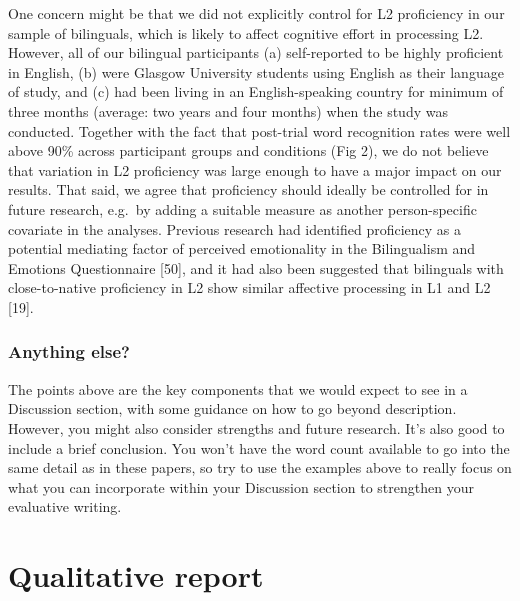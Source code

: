 \documentclass[
  english,
  letterpaper,
  DIV=11,
  numbers=noendperiod]{scrreprt}
\begin{document}
\begin{tcolorbox}[enhanced jigsaw, breakable, bottomtitle=1mm, leftrule=.75mm, opacityback=0, colbacktitle=quarto-callout-note-color!10!white, opacitybacktitle=0.6, toprule=.15mm, colback=white, left=2mm, coltitle=black, bottomrule=.15mm, titlerule=0mm, title={Study 3: Toivo et al., 2019}, toptitle=1mm, colframe=quarto-callout-note-color-frame, arc=.35mm, rightrule=.15mm]

One concern might be that we did not explicitly control for L2
proficiency in our sample of bilinguals, which is likely to affect
cognitive effort in processing L2. However, all of our bilingual
participants (a) self-reported to be highly proficient in English, (b)
were Glasgow University students using English as their language of
study, and (c) had been living in an English-speaking country for
minimum of three months (average: two years and four months) when the
study was conducted. Together with the fact that post-trial word
recognition rates were well above 90\% across participant groups and
conditions (Fig 2), we do not believe that variation in L2 proficiency
was large enough to have a major impact on our results. That said, we
agree that proficiency should ideally be controlled for in future
research, e.g.~by adding a suitable measure as another person-specific
covariate in the analyses. Previous research had identified proficiency
as a potential mediating factor of perceived emotionality in the
Bilingualism and Emotions Questionnaire {[}50{]}, and it had also been
suggested that bilinguals with close-to-native proficiency in L2 show
similar affective processing in L1 and L2 {[}19{]}.

\end{tcolorbox}

\subsection{Anything else?}\label{anything-else}

The points above are the key components that we would expect to see in a
Discussion section, with some guidance on how to go beyond description.
However, you might also consider strengths and future research. It's
also good to include a brief conclusion. You won't have the word count
available to go into the same detail as in these papers, so try to use
the examples above to really focus on what you can incorporate within
your Discussion section to strengthen your evaluative writing.

\chapter{Qualitative report}\label{ch12_qualitative_report}
\end{document}
